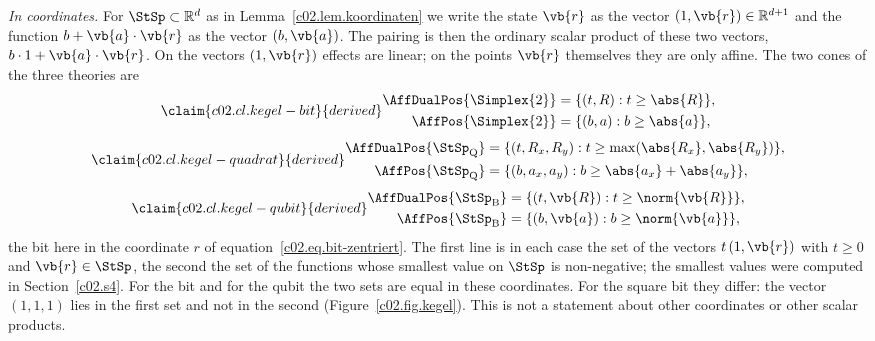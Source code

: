 \begin{vertiefung}
  \emph{In coordinates.} For $\StSp \subset \mathbb{R}^d$ as in
  Lemma~\ref{c02.lem.koordinaten} we write the state $\vb{r}$ as the vector
  $(1, \vb{r}) \in \mathbb{R}^{d+1}$ and the function $b + \vb{a}\cdot\vb{r}$ as the vector
  $(b, \vb{a})$. The pairing is then the ordinary scalar product of these two vectors,
  $b\cdot 1 + \vb{a}\cdot\vb{r}$. On the vectors $(1, \vb{r})$ effects are linear; on the
  points $\vb{r}$ themselves they are only affine. The two cones of the three theories are
  \begin{equation}\label{c02.eq.kegel-bit}\claim{c02.cl.kegel-bit}{derived}
    \begin{aligned}
      \AffDualPos{\Simplex{2}} &= \{ (t, R) : t \geq \abs{R} \}, \\
      \AffPos{\Simplex{2}} &= \{ (b, a) : b \geq \abs{a} \},
    \end{aligned}
  \end{equation}
  \begin{equation}\label{c02.eq.kegel-quadrat}\claim{c02.cl.kegel-quadrat}{derived}
    \begin{aligned}
      \AffDualPos{\StSp_{\mathrm{Q}}} &= \{ (t, R_x, R_y) : t \geq \max(\abs{R_x}, \abs{R_y}) \}, \\
      \AffPos{\StSp_{\mathrm{Q}}} &= \{ (b, a_x, a_y) : b \geq \abs{a_x} + \abs{a_y} \},
    \end{aligned}
  \end{equation}
  \begin{equation}\label{c02.eq.kegel-qubit}\claim{c02.cl.kegel-qubit}{derived}
    \begin{aligned}
      \AffDualPos{\StSp_{\mathrm{B}}} &= \{ (t, \vb{R}) : t \geq \norm{\vb{R}} \}, \\
      \AffPos{\StSp_{\mathrm{B}}} &= \{ (b, \vb{a}) : b \geq \norm{\vb{a}} \} ,
    \end{aligned}
  \end{equation}
  the bit here in the coordinate $r$ of equation~\eqref{c02.eq.bit-zentriert}.
  The first line is in each case the set of the vectors $t\,(1, \vb{r})$ with $t \geq 0$
  and $\vb{r} \in \StSp$, the second the set of the functions whose smallest value on
  $\StSp$ is non-negative; the smallest values were computed in Section~\ref{c02.s4}. For
  the bit and for the qubit the two sets are equal in these coordinates. For the square
  bit they differ: the vector $(1, 1, 1)$ lies in the first set and not in the second
  (Figure~\ref{c02.fig.kegel}). This is not a statement about other coordinates or other
  scalar products.


\end{vertiefung}
